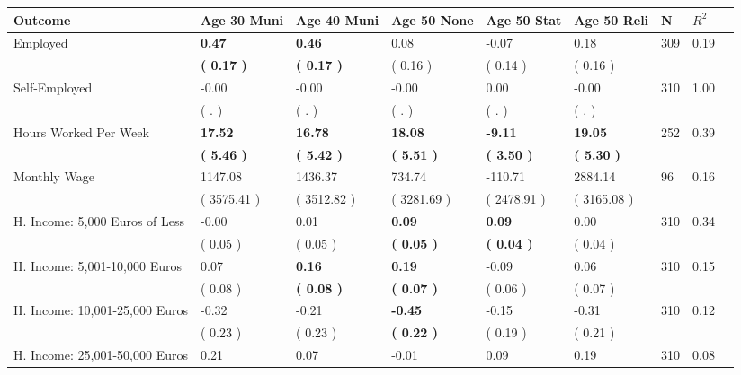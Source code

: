 \begin{tabular}{L{6.2cm} C{1.8cm} C{1.8cm} C{1.8cm} C{1.8cm} C{1.8cm} C{1.8cm} C{0.3cm} C{0.3cm}}
\toprule
 \textbf{Outcome} & \textbf{Age 30 Muni} & \textbf{Age 40 Muni} & \textbf{Age 50 None} & \textbf{Age 50 Stat} & \textbf{Age 50 Reli} & \textbf{N} & \textbf{$ R^2$} \\
\midrule
Employed & \textbf{     0.47} & \textbf{     0.46} &      0.08 &     -0.07 &      0.18  & 309 &       0.19 \\ 
 & \textbf{(     0.17 )} & \textbf{(     0.17 )} & (     0.16 ) & (     0.14 ) & (     0.16 )  & \\
Self-Employed &     -0.00 &     -0.00 &     -0.00 &      0.00 &     -0.00  & 310 &       1.00 \\ 
 & (        . ) & (        . ) & (        . ) & (        . ) & (        . )  & \\
Hours Worked Per Week & \textbf{    17.52} & \textbf{    16.78} & \textbf{    18.08} & \textbf{    -9.11} & \textbf{    19.05}  & 252 &       0.39 \\ 
 & \textbf{(     5.46 )} & \textbf{(     5.42 )} & \textbf{(     5.51 )} & \textbf{(     3.50 )} & \textbf{(     5.30 )}  & \\
Monthly Wage &   1147.08 &   1436.37 &    734.74 &   -110.71 &   2884.14  & 96 &       0.16 \\ 
 & (  3575.41 ) & (  3512.82 ) & (  3281.69 ) & (  2478.91 ) & (  3165.08 )  & \\
H. Income: 5,000 Euros of Less &     -0.00 &      0.01 & \textbf{     0.09} & \textbf{     0.09} &      0.00  & 310 &       0.34 \\ 
 & (     0.05 ) & (     0.05 ) & \textbf{(     0.05 )} & \textbf{(     0.04 )} & (     0.04 )  & \\
H. Income: 5,001-10,000 Euros &      0.07 & \textbf{     0.16} & \textbf{     0.19} &     -0.09 &      0.06  & 310 &       0.15 \\ 
 & (     0.08 ) & \textbf{(     0.08 )} & \textbf{(     0.07 )} & (     0.06 ) & (     0.07 )  & \\
H. Income: 10,001-25,000 Euros &     -0.32 &     -0.21 & \textbf{    -0.45} &     -0.15 &     -0.31  & 310 &       0.12 \\ 
 & (     0.23 ) & (     0.23 ) & \textbf{(     0.22 )} & (     0.19 ) & (     0.21 )  & \\
H. Income: 25,001-50,000 Euros &      0.21 &      0.07 &     -0.01 &      0.09 &      0.19  & 310 &       0.08 \\ 

\end{tabular}
